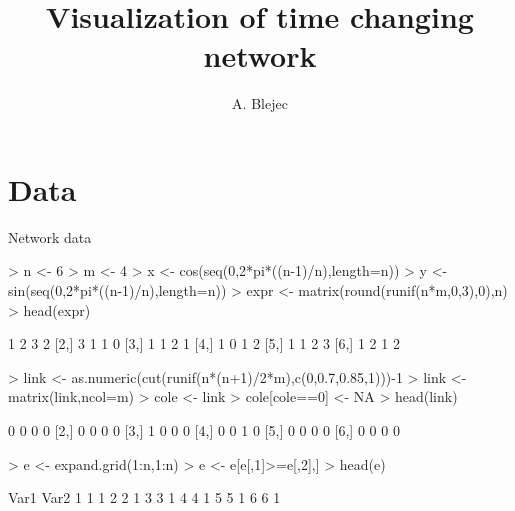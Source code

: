 \documentclass[a4paper,12pt]{article}
\begin{document}
\title{Visualization of time changing network}
\author{A. Blejec}
%

\maketitle
\tableofcontents

\section{Data}

Network data

\begin{Schunk}
\begin{Sinput}
> n <- 6
> m <- 4
> x <- cos(seq(0,2*pi*((n-1)/n),length=n))
> y <- sin(seq(0,2*pi*((n-1)/n),length=n))
> expr <- matrix(round(runif(n*m,0,3),0),n)
> head(expr)
\end{Sinput}
\begin{Soutput}
     [,1] [,2] [,3] [,4]
[1,]    1    2    3    2
[2,]    3    1    1    0
[3,]    1    1    2    1
[4,]    1    0    1    2
[5,]    1    1    2    3
[6,]    1    2    1    2
\end{Soutput}
\begin{Sinput}
> link <- as.numeric(cut(runif(n*(n+1)/2*m),c(0,0.7,0.85,1)))-1
> link <- matrix(link,ncol=m)
> cole <- link
> cole[cole==0] <- NA
> head(link)
\end{Sinput}
\begin{Soutput}
     [,1] [,2] [,3] [,4]
[1,]    0    0    0    0
[2,]    0    0    0    0
[3,]    1    0    0    0
[4,]    0    0    1    0
[5,]    0    0    0    0
[6,]    0    0    0    0
\end{Soutput}
\begin{Sinput}
> e <- expand.grid(1:n,1:n)
> e <- e[e[,1]>=e[,2],]
> head(e)
\end{Sinput}
\begin{Soutput}
  Var1 Var2
1    1    1
2    2    1
3    3    1
4    4    1
5    5    1
6    6    1
\end{Soutput}
\end{Schunk}
\end{document}

